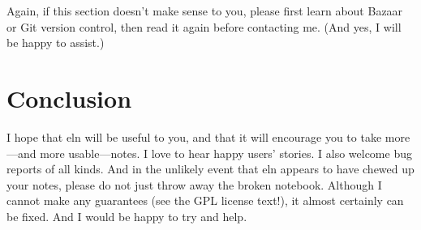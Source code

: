 \documentclass[11pt]{report}
\begin{document}
Again, if this section doesn't make sense to you, please first learn
about Bazaar or Git version control, then read it again before
contacting me. (And yes, I will be happy to assist.)

\section{Conclusion}

I hope that eln will be useful to you, and that it will encourage you
to take more---and more usable---notes. I love to hear happy users'
stories. I also welcome bug reports of all kinds. And in the unlikely
event that eln appears to have chewed up your notes, please do not
just throw away the broken notebook. Although I cannot make any
guarantees (see the GPL license text!), it almost certainly can be
fixed. And I would be happy to try and help.
\end{document}
